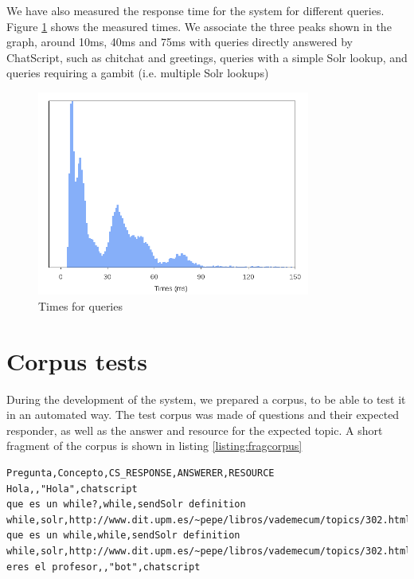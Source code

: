 We have also measured the response time for the system for different queries. Figure \ref{fig:times-demos} shows the measured times. We associate the three peaks shown in the graph, around 10ms, 40ms and 75ms with queries directly answered by ChatScript, such as chitchat and greetings, queries with a simple Solr lookup, and queries requiring a gambit (i.e. multiple Solr lookups)

\begin{figure}[!htbp]
    \centering
    \includegraphics[width=0.8\textwidth]{img/test/times.png}
    \caption{Times for queries}
    \label{fig:times-demos}
\end{figure}

\section{Corpus tests}

During the development of the system, we prepared a corpus, to be able to test it in an automated way. The test corpus was made of questions and their expected responder, as well as the answer and resource for the expected topic. A short fragment of the corpus is shown in listing \ref{listing:fragcorpus}

\begin{center} 
  \begin{lstlisting}[language={}, captionpos=b, caption=Fragment of the test corpus built for the system., label=listing:fragcorpus]   
Pregunta,Concepto,CS_RESPONSE,ANSWERER,RESOURCE
Hola,,"Hola",chatscript
que es un while?,while,sendSolr definition while,solr,http://www.dit.upm.es/~pepe/libros/vademecum/topics/302.html
que es un while,while,sendSolr definition while,solr,http://www.dit.upm.es/~pepe/libros/vademecum/topics/302.html
eres el profesor,,"bot",chatscript
  \end{lstlisting}
\end{center}

